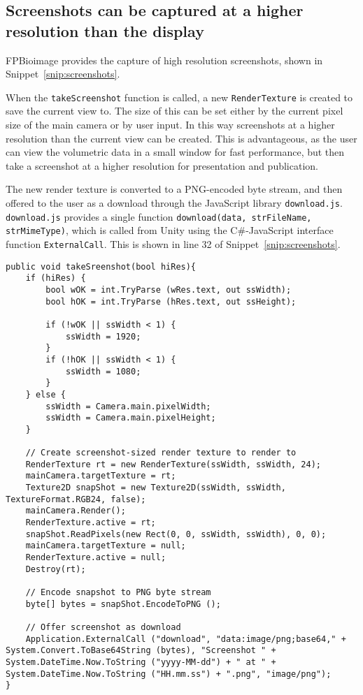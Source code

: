 \subsection{Screenshots can be captured at a higher resolution than the display}
FPBioimage provides the capture of high resolution screenshots, shown in Snippet~\ref{snip:screenshots}.

When the \texttt{takeScreenshot} function is called, a new \texttt{RenderTexture} is created to save the current view to.
The size of this can be set either by the current pixel size of the main camera or by user input.
In this way screenshots at a higher resolution than the current view can be created.
This is advantageous, as the user can view the volumetric data in a small window for fast performance, but then take a screenshot at a higher resolution for presentation and publication.

The new render texture is converted to a PNG-encoded byte stream, and then offered to the user as a download through the JavaScript library \texttt{download.js}.
\texttt{download.js} provides a single function \texttt{download(data, strFileName, strMimeType)}, which is called from Unity using the C\#-JavaScript interface function \texttt{ExternalCall}.
This is shown in line 32 of Snippet~\ref{snip:screenshots}.

\begin{lstfloat}
\begin{lstlisting}[language={[Sharp]c}, label={snip:screenshots}, caption={C\# code for capturing a high-resolution screenshot and presenting it to the user as a download}]
public void takeSreenshot(bool hiRes){
	if (hiRes) {
		bool wOK = int.TryParse (wRes.text, out ssWidth);
		bool hOK = int.TryParse (hRes.text, out ssHeight);

		if (!wOK || ssWidth < 1) {
			ssWidth = 1920;
		}
		if (!hOK || ssWidth < 1) {
			ssWidth = 1080;
		}
	} else {
		ssWidth = Camera.main.pixelWidth;
		ssWidth = Camera.main.pixelHeight;
	}

	// Create screenshot-sized render texture to render to
	RenderTexture rt = new RenderTexture(ssWidth, ssWidth, 24);
	mainCamera.targetTexture = rt;
	Texture2D snapShot = new Texture2D(ssWidth, ssWidth, TextureFormat.RGB24, false);
	mainCamera.Render();
	RenderTexture.active = rt;
	snapShot.ReadPixels(new Rect(0, 0, ssWidth, ssWidth), 0, 0);
	mainCamera.targetTexture = null;
	RenderTexture.active = null;
	Destroy(rt);

	// Encode snapshot to PNG byte stream
	byte[] bytes = snapShot.EncodeToPNG ();

	// Offer screenshot as download
	Application.ExternalCall ("download", "data:image/png;base64," + System.Convert.ToBase64String (bytes), "Screenshot " + System.DateTime.Now.ToString ("yyyy-MM-dd") + " at " + System.DateTime.Now.ToString ("HH.mm.ss") + ".png", "image/png");
}
\end{lstlisting}
\end{lstfloat}

